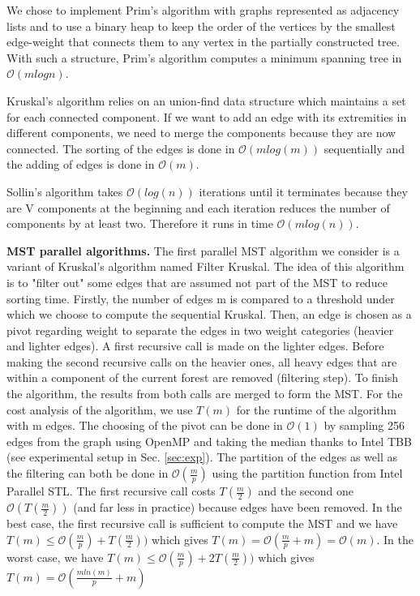 \documentclass[letterpaper]{article}
\newcommand{\mypar}[1]{{\bf #1.}}
\begin{document}
We chose to implement Prim's algorithm with graphs represented as adjacency lists and to use a binary heap to keep the order of the vertices by the smallest edge-weight that connects them to any vertex in the partially constructed tree. With such a structure, Prim's algorithm computes a minimum spanning tree in $\mathcal{O}(mlogn)$.

Kruskal's algorithm relies on an union-find data structure which maintains a set for each connected component. If we want to add an edge with its extremities in different components, we need to merge the components because they are now connected. The sorting of the edges is done in $\mathcal{O}(mlog(m))$ sequentially and the adding of edges is done in $\mathcal{O}(m)$.

Sollin's algorithm takes $\mathcal{O}(log(n))$ iterations until it terminates because they are V components at the beginning and each iteration reduces the number of components by at least two. Therefore it runs in time $\mathcal{O}(mlog(n))$.

\mypar{MST parallel algorithms}  The first parallel MST algorithm we consider is a variant of Kruskal's algorithm named Filter Kruskal. The idea of this algorithm is to "filter out" some edges that are assumed not part of the MST to reduce sorting time. Firstly, the number of edges m is compared to a threshold under which we choose to compute the sequential Kruskal. Then, an edge is chosen as a pivot regarding weight to separate the edges in two weight categories (heavier and lighter edges). A first recursive call is made on the lighter edges. Before making the second recursive calls on the heavier ones, all heavy edges that are within a component of the current forest are removed (filtering step). To finish the algorithm, the results from both calls are merged to form the MST. For the cost analysis of the algorithm, we use $T(m)$ for the runtime of the algorithm with m edges. The choosing of the pivot can be done in $\mathcal{O}(1)$ by sampling 256 edges from the graph using OpenMP and taking the median thanks to Intel TBB (see experimental setup in Sec. \ref{sec:exp}). The partition of the edges as well as the filtering can both be done in $\mathcal{O}(\frac{m}{p})$ using the partition function from Intel Parallel STL. The first recursive call costs $T(\frac{m}{2})$ and the second one $\mathcal{O}(T(\frac{m}{2}))$ (and far less in practice) because edges have been removed. In the best case, the first recursive call is sufficient to compute the MST and we have $T(m) \leq  \mathcal{O}(\frac{m}{p}) + T(\frac{m}{2})) $ which gives $T(m) = \mathcal{O}(\frac{m}{p} + m) = \mathcal{O}(m)$. In the worst case, we have $T(m) \leq  \mathcal{O}(\frac{m}{p}) + 2T(\frac{m}{2})) $ which gives $T(m) = \mathcal{O}(\frac{mln(m)}{p} + m)$
\end{document}
